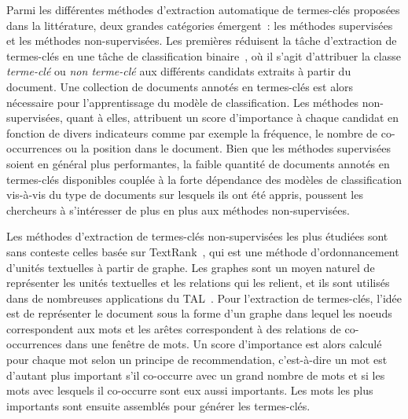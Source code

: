   Parmi les différentes méthodes d'extraction automatique de termes-clés proposées dans la littérature, deux grandes catégories émergent~: les méthodes supervisées et les méthodes non-supervisées.
  Les premières réduisent la tâche d'extraction de termes-clés en une tâche de classification binaire~\cite{witten1999kea}, où il s'agit d'attribuer la classe \og{}\textit{terme-clé}\fg{} ou \og{}\textit{non terme-clé}\fg{} aux différents candidats extraits à partir du document.
  Une collection de documents annotés en termes-clés est alors nécessaire pour l'apprentissage du modèle de classification.
  Les méthodes non-supervisées, quant à elles, attribuent un score d'importance à chaque candidat en fonction de divers indicateurs comme par exemple la fréquence, le nombre de co-occurrences ou la position dans le document.
  Bien que les méthodes supervisées soient en général plus performantes, la faible quantité de documents annotés en termes-clés disponibles couplée à la forte dépendance des modèles de classification vis-à-vis du type de documents sur lesquels ils ont été appris, poussent les chercheurs à s'intéresser de plus en plus aux méthodes non-supervisées.

  Les méthodes d'extraction de termes-clés non-supervisées les plus étudiées sont sans conteste celles basée sur TextRank~\cite{mihalcea2004textrank}, qui est une méthode d'ordonnancement d'unités textuelles à partir de graphe.
  Les graphes sont un moyen naturel de représenter les unités textuelles et les relations qui les relient, et ils sont utilisés dans de nombreuses applications du TAL~\cite{kozareva2013textgraphs}.
  Pour l'extraction de termes-clés, l'idée est de représenter le document sous la forme d'un graphe dans lequel les noeuds correspondent aux mots et les arêtes correspondent à des relations de co-occurrences dans une fenêtre de mots.
  Un score d'importance est alors calculé pour chaque mot selon un principe de recommendation, c'est-à-dire un mot est d'autant plus important s'il co-occurre avec un grand nombre de mots et si les mots avec lesquels il co-occurre sont eux aussi importants.
  Les mots les plus importants sont ensuite assemblés pour générer les termes-clés.

